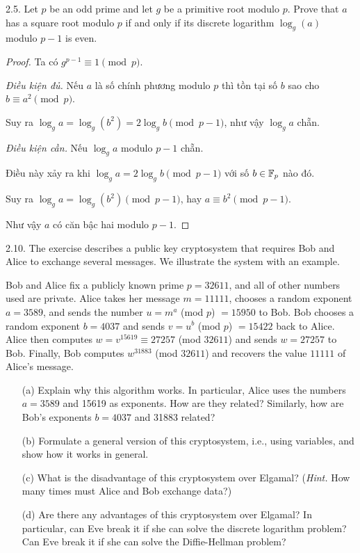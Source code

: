 2.5. Let $p$ be an odd prime and let $g$ be a primitive root modulo $p$. Prove that $a$ has a square root modulo $p$ if and only if its discrete logarithm $\log_g(a)$ modulo $p-1$ is even. 

\begin{proof}
    Ta có $g^{p-1} \equiv 1 \pmod p$.

    \textit{Điều kiện đủ.} Nếu  $a$ là số chính phương modulo $p$ thì tồn tại số $b$ sao cho $b \equiv a^2 \pmod p$.

    Suy ra $\log_g a = \log_g(b^2) = 2 \log_g b \pmod{p-1}$, như vậy $\log_ga$ chẵn. 

    \textit{Điều kiện cần.} Nếu $\log_g a$ modulo $p-1$ chẵn.

    Điều này xảy ra khi $\log_ga = 2\log_g b \pmod{p-1}$ với số $b \in \mathbb{F}_p$ nào đó.

    Suy ra $\log_ga = \log_g (b^2) \pmod{p-1}$, hay $a \equiv b^2 \pmod{p-1}$.

    Như vậy $a$ có căn bậc hai modulo $p-1$.
\end{proof}

2.10. The exercise describes a public key cryptosystem that requires Bob and Alice to exchange several messages. We illustrate the system with an example.

Bob and Alice fix a publicly known prime $p=32611$, and all of other numbers used are private. Alice takes her message $m=11111$, chooses a random exponent $a=3589$, and sends the number $u=m^a$ (mod $p$) $=15950$ to Bob. Bob chooses a random exponent $b=4037$ and sends $v=u^b$ (mod $p$) $=15422$ back to Alice. Alice then computes $w=v^{15619} \equiv 27257$ (mod $32611$) and sends $w=27257$ to Bob. Finally, Bob computes $w^{31883}$ (mod $32611$) and recovers the value $11111$ of Alice's message.

\begin{enumerate}
    \item[(a)] Explain why this algorithm works. In particular, Alice uses the numbers $a=3589$ and 15619 as exponents. How are they related? Similarly, how are Bob's exponents $b=4037$ and 31883 related?
    \item[(b)] Formulate a general version of this cryptosystem, i.e., using variables, and show how it works in general.
    \item[(c)] What is the disadvantage of this cryptosystem over Elgamal? (\textit{Hint.} How many times must Alice and Bob exchange data?)
    \item[(d)] Are there any advantages of this cryptosystem over Elgamal? In particular, can Eve break it if she can solve the discrete logarithm problem? Can Eve break it if she can solve the Diffie-Hellman problem?
\end{enumerate}

